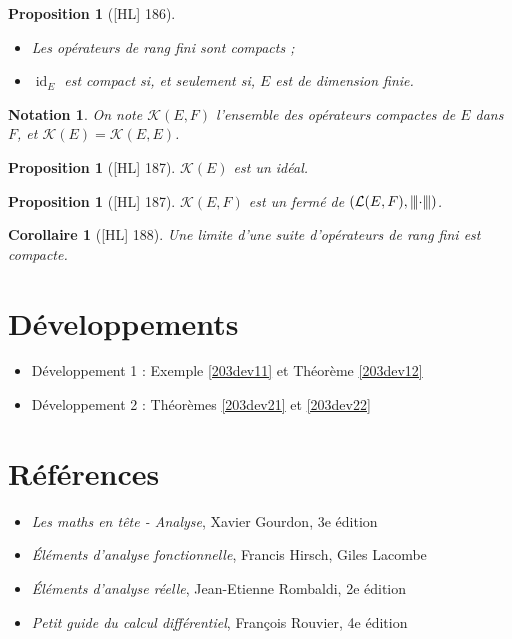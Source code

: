 \documentclass[10pt, a4paper, parskip=full, twoside, twocolumn]{report}
\newtheorem{proposition}[definition]{Proposition}
\newtheorem{corollary}[definition]{Corollaire}
\newtheorem{notation}[definition]{Notation}
\DeclareMathOperator{\id}{id}
\newcommand{\vertiii}[1]{{\left\vert\kern-0.25ex\left\vert\kern-0.25ex\left\vert #1 
    \right\vert\kern-0.25ex\right\vert\kern-0.25ex\right\vert}}
\begin{document}
\begin{proposition}[\textnormal{[HL] 186}]
	\begin{itemize}
		\item Les opérateurs de rang fini sont compacts ;
		\item $\id_E$ est compact si, et seulement si, $E$ est de dimension finie.
	\end{itemize}
\end{proposition}

\begin{notation}
	On note $\mathcal{K}(E,F)$ l'ensemble des opérateurs compactes de $E$ dans $F$, et $\mathcal{K}(E) = \mathcal{K}(E,E)$.
\end{notation}

\begin{proposition}[\textnormal{[HL] 187}]
	$\mathcal{K}(E)$ est un idéal.
\end{proposition}

\begin{proposition}[\textnormal{[HL] 187}]
	$\mathcal{K}(E,F)$ est un fermé de $(\mathcal{L}(E,F), \vertiii \cdot)$.
\end{proposition}

\begin{corollary}[\textnormal{[HL] 188}]
	Une limite d'une suite d'opérateurs de rang fini est compacte.
\end{corollary}

\section*{Développements}
\begin{itemize}
	\item Développement 1 : Exemple \ref{203dev11} et Théorème \ref{203dev12}
	\item Développement 2 : Théorèmes \ref{203dev21} et \ref{203dev22}
\end{itemize}

\section*{Références}
\begin{itemize}
	\item[G] \emph{Les maths en tête - Analyse}, Xavier Gourdon, 3e édition 
	\item[HL] \emph{Éléments d'analyse fonctionnelle}, Francis Hirsch, Giles Lacombe
	\item[R] \emph{Éléments d'analyse réelle}, Jean-Etienne Rombaldi, 2e édition
	\item[Rv] \emph{Petit guide du calcul différentiel}, François Rouvier, 4e édition
\end{itemize}
\end{document}

